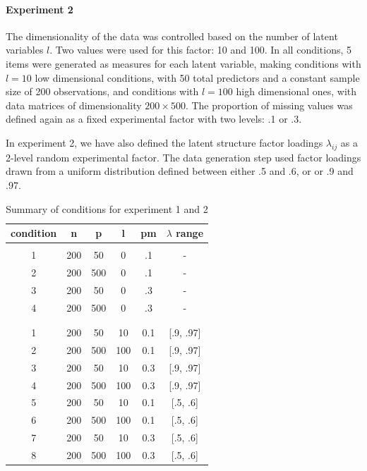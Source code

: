	\paragraph{Experiment 2}
	The dimensionality of the data was controlled based on the number of latent variables $l$.
	Two values were used for this factor: 10 and 100. 
	In all conditions, 5 items were generated as measures for each latent variable, making conditions with $l = 10$ 
	low dimensional conditions, with 50 total predictors and a constant sample size of 200 observations, and 
	conditions with $l = 100$ high dimensional ones, with data matrices of dimensionality $200 \times 500$.
	The proportion of missing values was defined again as a fixed experimental factor with two levels: .1 or .3.

	In experiment 2, we have also defined the latent structure factor loadings $\lambda_{ij}$ as a 2-level random experimental factor.
	The data generation step used factor loadings drawn from a uniform distribution defined between either .5 and .6, or 
	or .9 and .97.

\begin{table}[t]
   \begin{center}
        \begin{tabular}{ c c c c c c }
		\textbf{condition} & \textbf{n} & \textbf{p} & \textbf{l} & \textbf{pm} & \textbf{$\lambda$ range} \\ 
		\hline

		\rowcolor{Gray}
 		\multicolumn{6}{c}{Experiment 1} \\
		\hline

		1 & 200 & 50 & 0 & .1 & - \\
		2 & 200 & 500 & 0 & .1 & - \\
		3 & 200 & 50 & 0 & .3 & - \\
		4 & 200 & 500 & 0 & .3 & - \\
	\hline
		& & & & & \\ 

		\rowcolor{Gray}
 		\multicolumn{6}{c}{Experiment 2} \\
		\hline

  1 & 200 & 50 &  10 &  0.1 & [.9, .97] \\
  2 & 200 & 500 & 100 & 0.1 & [.9, .97] \\
  3 & 200 & 50 &  10 &  0.3 & [.9, .97] \\
  4 & 200 & 500 & 100 & 0.3 & [.9, .97] \\
  5 & 200 & 50 &  10 &  0.1 & [.5, .6]  \\
  6 & 200 & 500 & 100 & 0.1 & [.5, .6]  \\
  7 & 200 & 50 &  10 &  0.3 & [.5, .6]  \\
  8 & 200 & 500 & 100 & 0.3 & [.5, .6]  \\

		\hline
        \end{tabular}
    \end{center}
\caption{Summary of conditions for experiment 1 and 2}
\label{table:condSum}
\end{table}


